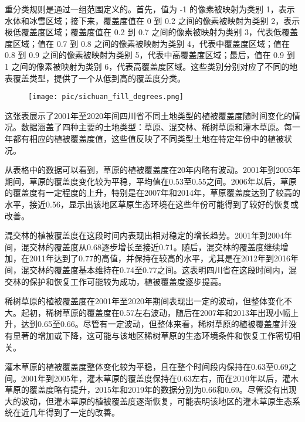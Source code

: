 \documentclass{article}
\begin{document}
		\par 重分类规则是通过一组范围定义的。首先，值为 -1 的像素被映射为类别 1，表示水体和冰雪区域；接下来，覆盖度值在 0 到 0.2 之间的像素被映射为类别 2，表示极低覆盖度区域；覆盖度值在 0.2 到 0.7 之间的像素被映射为类别 3，代表低覆盖度区域；值在 0.7 到 0.8 之间的像素被映射为类别 4，代表中覆盖度区域；值在 0.8 到 0.9 之间的像素被映射为类别 5，代表中高覆盖度区域；最后，值在 0.9 到 1 之间的像素被映射为类别 6，代表高覆盖度区域。这些类别分别对应了不同的地表覆盖类型，提供了一个从低到高的覆盖度分类。
		\begin{figure}[H]  %
			\centering
			\texttt{[image: pic/sichuan\_fill\_degrees.png]} %
		
				\end{figure}
		\par 这张表展示了2001年至2020年间四川省不同土地类型的植被覆盖度随时间变化的情况。数据涵盖了四种主要的土地类型：草原、混交林、稀树草原和灌木草原。每一年都有相应的植被覆盖度值，这些值反映了不同类型土地在特定年份中的植被状况。
		
		从表格中的数据可以看到，草原的植被覆盖度在20年内略有波动。2001年到2005年期间，草原的覆盖度变化较为平稳，平均值在0.53至0.55之间。2006年以后，草原的覆盖度有一定程度的上升，特别是在2007年和2014年，草原覆盖度达到了较高的水平，接近0.56，显示出该地区草原生态环境在这些年份可能得到了较好的恢复或改善。
		
		混交林的植被覆盖度在这段时间内表现出相对稳定的增长趋势。2001年到2004年间，混交林的覆盖度从0.68逐步增长至接近0.71。随后，混交林的覆盖度继续增加，在2011年达到了0.77的高值，并保持在较高的水平，尤其是在2012年到2016年间，混交林的覆盖度基本维持在0.74至0.77之间。这表明四川省在这段时间内，混交林的保护和恢复工作可能较为成功，植被覆盖度逐步提高。
		
		稀树草原的植被覆盖度在2001年至2020年期间表现出一定的波动，但整体变化不大。起初，稀树草原的覆盖度在0.57左右波动，随后在2007年和2013年出现小幅上升，达到0.65至0.66。尽管有一定波动，但整体来看，稀树草原的植被覆盖度并没有显著的增加或下降，这可能与该地区稀树草原的生态环境条件和恢复工作密切相关。
		
		灌木草原的植被覆盖度整体变化较为平稳，且在整个时间段内保持在0.63至0.69之间。2001年到2005年，灌木草原的覆盖度保持在0.63左右，而在2010年以后，灌木草原的覆盖度略有提升，2015年和2019年的数据分别为0.66和0.69。尽管没有出现大的波动，但灌木草原的植被覆盖度逐渐恢复，可能表明该地区的灌木草原生态系统在近几年得到了一定的改善。
		
\end{document}
